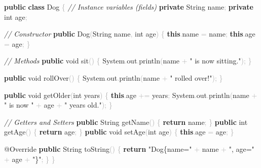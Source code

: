 \documentclass[
  justified,
  openright,
]{tufte-book}
\newcommand{\KeywordTok}[1]{\textcolor{CodeKeyword}{\textbf{#1}}}  %
\newcommand{\StringTok}[1]{\textcolor{CodeString}{#1}}              %
\newcommand{\CommentTok}[1]{\textcolor{CodeComment}{\textit{#1}}}  %
\newcommand{\CodeFuncTok}[1]{\textcolor{CodeKeyword}{#1}}           %
\newcommand{\CodeTypeTok}[1]{\textcolor{CodeType}{#1}}              %
\newcommand{\OperatorTok}[1]{\textcolor{DarkGray}{#1}}              %
\newenvironment{Shaded}{%
  \begin{mdframed}[style=TufteCode]%
}{%
  \end{mdframed}%
}
\begin{document}
\begin{Shaded}
\begin{Highlighting}[]
\KeywordTok{public} \KeywordTok{class} Dog \OperatorTok{\{}
    \CommentTok{// Instance variables (fields)}
    \KeywordTok{private} String name\OperatorTok{;}
    \KeywordTok{private} \CodeTypeTok{int} age\OperatorTok{;}
 
    \CommentTok{// Constructor}
    \KeywordTok{public} \CodeFuncTok{Dog}\OperatorTok{(}String name\OperatorTok{,} \CodeTypeTok{int} age\OperatorTok{)} \OperatorTok{\{}
        \KeywordTok{this}\OperatorTok{.}\CodeFuncTok{name} \OperatorTok{=} name\OperatorTok{;}
        \KeywordTok{this}\OperatorTok{.}\CodeFuncTok{age} \OperatorTok{=} age\OperatorTok{;}
    \OperatorTok{\}}
 
    \CommentTok{// Methods}
    \KeywordTok{public} \CodeTypeTok{void} \CodeFuncTok{sit}\OperatorTok{()} \OperatorTok{\{}
        System\OperatorTok{.}\CodeFuncTok{out}\OperatorTok{.}\CodeFuncTok{println}\OperatorTok{(}name \OperatorTok{+} \StringTok{" is now sitting."}\OperatorTok{);}
    \OperatorTok{\}}
 
    \KeywordTok{public} \CodeTypeTok{void} \CodeFuncTok{rollOver}\OperatorTok{()} \OperatorTok{\{}
        System\OperatorTok{.}\CodeFuncTok{out}\OperatorTok{.}\CodeFuncTok{println}\OperatorTok{(}name \OperatorTok{+} \StringTok{" rolled over!"}\OperatorTok{);}
    \OperatorTok{\}}
 
    \KeywordTok{public} \CodeTypeTok{void} \CodeFuncTok{getOlder}\OperatorTok{(}\CodeTypeTok{int} years\OperatorTok{)} \OperatorTok{\{}
        \KeywordTok{this}\OperatorTok{.}\CodeFuncTok{age} \OperatorTok{+=} years\OperatorTok{;}
        System\OperatorTok{.}\CodeFuncTok{out}\OperatorTok{.}\CodeFuncTok{println}\OperatorTok{(}name \OperatorTok{+} \StringTok{" is now "} \OperatorTok{+} age \OperatorTok{+} \StringTok{" years old."}\OperatorTok{);}
    \OperatorTok{\}}
 
    \CommentTok{// Getters and Setters}
    \KeywordTok{public} String \CodeFuncTok{getName}\OperatorTok{()} \OperatorTok{\{} \KeywordTok{return} name\OperatorTok{;} \OperatorTok{\}}
    \KeywordTok{public} \CodeTypeTok{int} \CodeFuncTok{getAge}\OperatorTok{()} \OperatorTok{\{} \KeywordTok{return} age\OperatorTok{;} \OperatorTok{\}}
    \KeywordTok{public} \CodeTypeTok{void} \CodeFuncTok{setAge}\OperatorTok{(}\CodeTypeTok{int} age\OperatorTok{)} \OperatorTok{\{} \KeywordTok{this}\OperatorTok{.}\CodeFuncTok{age} \OperatorTok{=} age\OperatorTok{;} \OperatorTok{\}}
 
    \CodeTypeTok{@Override}
    \KeywordTok{public} String \CodeFuncTok{toString}\OperatorTok{()} \OperatorTok{\{}
        \KeywordTok{return} \StringTok{"Dog\{name=\textquotesingle{}"} \OperatorTok{+} name \OperatorTok{+} \StringTok{"\textquotesingle{}, age="} \OperatorTok{+} age \OperatorTok{+} \StringTok{"\}"}\OperatorTok{;}
    \OperatorTok{\}}
\OperatorTok{\}}
\end{Highlighting}
\end{Shaded}
\end{document}
